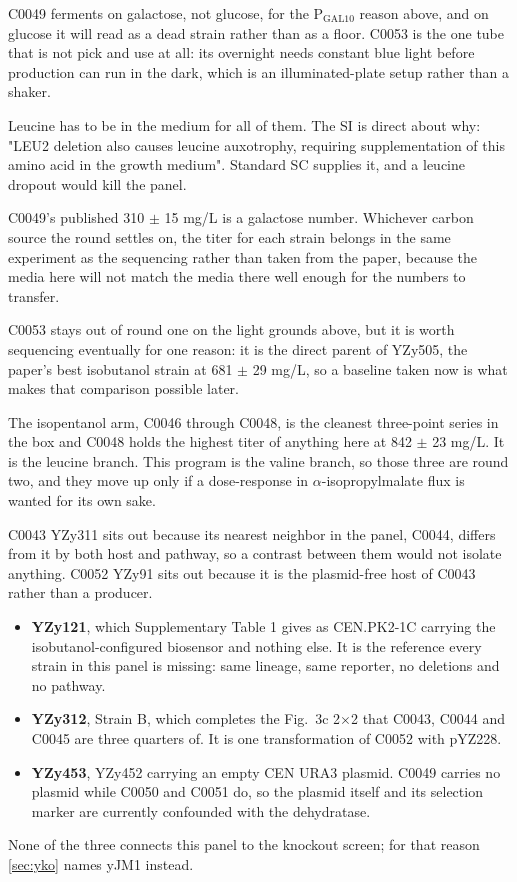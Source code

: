  C0049 ferments on galactose,
not glucose, for the P$_{\text{GAL10}}$ reason above, and on glucose it will read
as a dead strain rather than as a floor. C0053 is the one tube that is not pick
and use at all: its overnight needs constant blue light before production can run
in the dark, which is an illuminated-plate setup rather than a shaker.

Leucine has to be in the medium for all of them. The SI is direct about why:
"LEU2 deletion also causes leucine auxotrophy, requiring supplementation of this
amino acid in the growth medium". Standard SC supplies it, and a leucine dropout
would kill the panel.

 C0049's published
310 $\pm$ 15 mg/L is a galactose number. Whichever carbon source the round
settles on, the titer for each strain belongs in the same experiment as the
sequencing rather than taken from the paper, because the media here will not
match the media there well enough for the numbers to transfer.

\noindent
C0053 stays out of round one on the light grounds above, but it is worth
sequencing eventually for one reason: it is the direct parent of YZy505, the
paper's best isobutanol strain at 681 $\pm$ 29 mg/L, so a baseline taken now is
what makes that comparison possible later.

 The isopentanol arm, C0046 through C0048, is
the cleanest three-point series in the box and C0048 holds the highest titer of
anything here at 842 $\pm$ 23 mg/L. It is the leucine branch. This program is
the valine branch, so those three are round two, and they move up only if a
dose-response in $\alpha$-isopropylmalate flux is wanted for its own sake.

C0043 YZy311 sits out because its nearest neighbor in the panel, C0044, differs
from it by both host and pathway, so a contrast between them would not isolate
anything. C0052 YZy91 sits out because it is the plasmid-free host of C0043
rather than a producer.


\begin{itemize}\setlength\itemsep{0.15em}
  \item \textbf{YZy121}, which Supplementary Table 1 gives as CEN.PK2-1C
    carrying the isobutanol-configured biosensor and nothing else. It is the
    reference every strain in this panel is missing: same lineage, same
    reporter, no deletions and no pathway.
  \item \textbf{YZy312}, Strain B, which completes the Fig.~3c 2$\times$2 that
    C0043, C0044 and C0045 are three quarters of. It is one transformation of
    C0052 with pYZ228.
  \item \textbf{YZy453}, YZy452 carrying an empty CEN URA3 plasmid. C0049
    carries no plasmid while C0050 and C0051 do, so the plasmid itself and its
    selection marker are currently confounded with the dehydratase.
\end{itemize}

\noindent
None of the three connects this panel to the knockout screen; for that reason
\cref{sec:yko} names yJM1 instead.

